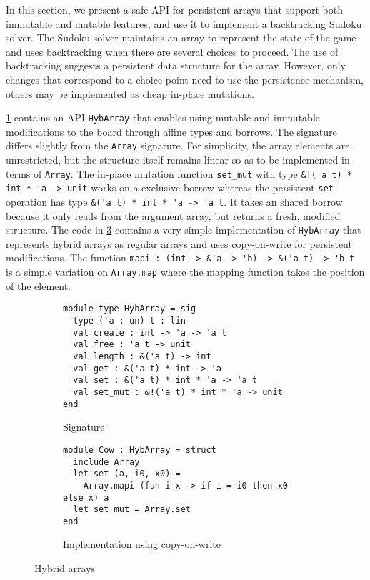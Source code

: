 In this section, we present
a safe API for persistent arrays that support both immutable and mutable features,
and use it to implement a backtracking Sudoku solver.
The Sudoku solver maintains an array to represent the state of
the game and uses backtracking when there are several choices to proceed.
The use of backtracking suggests a persistent data structure for the array.
However, only changes that correspond to a choice point need to use
the persistence mechanism, others may be implemented as
cheap in-place mutations.

\cref{sig:hybarray} contains an API \lstinline/HybArray/
that enables using mutable and immutable modifications to
the board through affine types and borrows.
The signature differs slightly from the \lstinline/Array/
signature. For simplicity, the array elements are unrestricted, but
the structure itself remains linear so as to be implemented in terms of \lstinline/Array/.
The in-place mutation function \lstinline/set_mut/ with type
\lstinline/&!('a t) * int * 'a -> unit/ works on a exclusive borrow  whereas the persistent
\lstinline/set/ operation has type \lstinline/&('a t) * int * 'a -> 'a t/. It
takes an shared borrow because it only reads from the
argument array, but returns a fresh,  modified structure.
The code in \cref{ex:cow} contains a very simple implementation of
\lstinline/HybArray/ that represents hybrid arrays
as regular arrays and uses copy-on-write for persistent
modifications. The function
\lstinline/mapi : (int -> &'a -> 'b) -> &('a t) -> 'b t /
is a simple variation on \lstinline/Array.map/ where the mapping function
takes the position of the element.


\begin{figure}[tp]
  \centering
  \begin{subfigure}{1\linewidth}
\begin{lstlisting}
module type HybArray = sig
  type ('a : un) t : lin
  val create : int -> 'a -> 'a t
  val free : 'a t -> unit
  val length : &('a t) -> int
  val get : &('a t) * int -> 'a
  val set : &('a t) * int * 'a -> 'a t
  val set_mut : &!('a t) * int * 'a -> unit
end
\end{lstlisting}
    \vspace{-15pt}
    \caption{Signature}
    \label{sig:hybarray}
  \end{subfigure}

  \begin{subfigure}{1\linewidth}
\begin{lstlisting}
module Cow : HybArray = struct
  include Array
  let set (a, i0, x0) =
    Array.mapi (fun i x -> if i = i0 then x0 else x) a
  let set_mut = Array.set
end
\end{lstlisting}
    \vspace{-15pt}
    \caption{Implementation using copy-on-write}
    \label{ex:cow}
  \end{subfigure}
  \caption{Hybrid arrays}
\end{figure}

